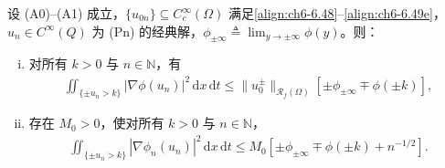 \documentclass[../../main.tex]{subfiles}%
\begin{document}
\begin{lemma}[水平集上的梯度估计]\label{lemma:ch06-6.5.8}
设 (A0)--(A1) 成立，$\{u_{0n}\}\subseteq C^\infty_c(\Omega)$ 满足\eqref{align:ch6-6.48}--\eqref{align:ch6-6.49e}，$u_n\in C^\infty(Q)$ 为 (Pn) 的经典解，$\phi_{\pm\infty}\triangleq\lim_{y\to\pm\infty}\phi(y)$。则：
\begin{enumerate}[(i)]
\item 对所有 $k>0$ 与 $n\in\mathbb{N}$，有
\begin{align}
\iint_{\{\pm u_n>k\}}|\nabla\phi(u_n)|^2\,\mathrm{d}x\,\mathrm{d}t
\leqslant\|u^\pm_0\|_{\mathscr{R}_f(\Omega)}[\pm\phi_{\pm\infty}\mp\phi(\pm k)], \label{align:ch6-6.74}
\end{align}
\item 存在 $M_0>0$，使对所有 $k>0$ 与 $n\in\mathbb{N}$，
\begin{align}
\iint_{\{\pm u_n>k\}}|\nabla\phi_n(u_n)|^2\,\mathrm{d}x\,\mathrm{d}t
\leqslant M_0[\pm\phi_{\pm\infty}\mp\phi(\pm k)+n^{-1/2}]. \label{align:ch6-6.75}
\end{align}
\end{enumerate}
\end{lemma}
\end{document}

